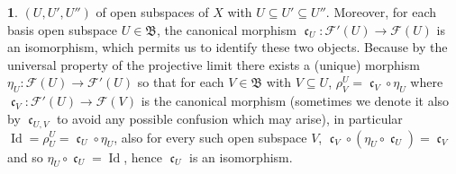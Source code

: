 \documentclass[12pt]{amsart}
\newcommand{\Id}{\operatorname{Id}}
\newcommand{\can}{\operatorname{\mathfrak{c}}}
\theoremstyle{definition}
\newtheorem{bk}[proposition]{}
\begin{document}
\begin{bk}
$(U, U', U'')$ of open subspaces of $X$ with $U\subseteq U'\subseteq U''$. Moreover, for each basis open subspace $U\in\mathfrak{B}$, the canonical morphism $\can_{U}:\mathscr{F}'(U)\rightarrow\mathscr{F}(U)$ is an isomorphism, which permits us to identify these two objects. Because by the universal property of the projective limit there exists a (unique) morphism $\eta_{U}:\mathscr{F}(U)\rightarrow\mathscr{F}'(U)$ so that  for each $V\in\mathfrak{B}$ with $V\subseteq U$, $\rho_{V}^{U}=\can_{V}\circ\eta_{U}$ where $\can_{V}:\mathscr{F}'(U)\rightarrow\mathscr{F}(V)$ is the canonical morphism (sometimes we denote it also by $\can_{U, V}$ to avoid any possible confusion which may arise), in particular $\Id=\rho_{U}^{U}=\can_{U}\circ\eta_{U}$, also for every such open subspace $V$, $\can_{V}\circ(\eta_{U}\circ\can_{U})=\can_{V}$ and so $\eta_{U}\circ\can_{U}=\Id$, hence $\can_{U}$ is an isomorphism.

\end{bk}
\end{document}
